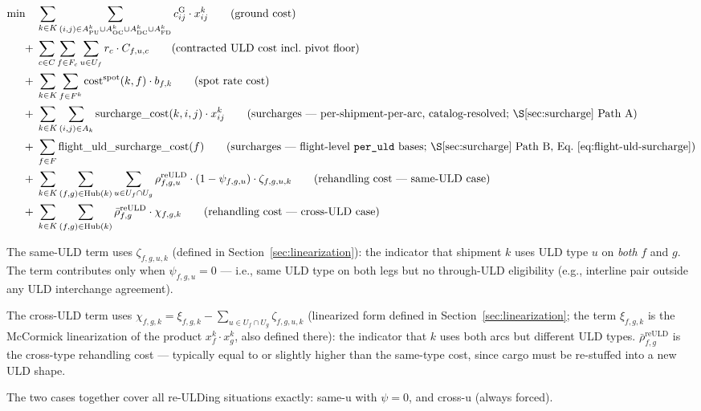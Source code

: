 \documentclass[11pt,a4paper]{article}
\theoremstyle{definition}
\begin{document}
\begin{align}
  \min \quad
  & \sum_{k \in K} \sum_{(i,j) \in A^k_{\text{PU}} \cup A^k_{\text{OC}} \cup A^k_{\text{DC}} \cup A^k_{\text{FD}}} c_{ij}^{\text{G}} \cdot x_{ij}^k
    \tag{ground cost} \\
  +\;
  & \sum_{c \in C} \sum_{f \in F_c} \sum_{u \in U_f} r_c \cdot C_{f,u,c}
    \tag{contracted ULD cost incl.\ pivot floor} \\
  +\;
  & \sum_{k \in K} \sum_{f \in F^k} \text{cost}^{\text{spot}}(k, f) \cdot b_{f,k}
    \tag{spot rate cost} \\
  +\;
  & \sum_{k \in K} \sum_{(i,j) \in A_k} \text{surcharge\_cost}(k, i, j) \cdot x_{ij}^k
    \tag{surcharges --- per-shipment-per-arc, catalog-resolved; \S\ref{sec:surcharge} Path~A} \\
  +\;
  & \sum_{f \in F} \text{flight\_uld\_surcharge\_cost}(f)
    \tag{surcharges --- flight-level \texttt{per\_uld} bases; \S\ref{sec:surcharge} Path~B, Eq.~\ref{eq:flight-uld-surcharge}} \\
  +\;
  & \sum_{k \in K} \sum_{(f,g) \in \text{Hub}(k)} \sum_{u \in U_f \cap U_g} \rho_{f,g,u}^{\text{reULD}} \cdot (1 - \psi_{f,g,u}) \cdot \zeta_{f,g,u,k}
    \tag{rehandling cost --- same-ULD case} \\
  +\;
  & \sum_{k \in K} \sum_{(f,g) \in \text{Hub}(k)} \bar{\rho}^{\text{reULD}}_{f,g} \cdot \chi_{f,g,k}
    \tag{rehandling cost --- cross-ULD case}
\end{align}

The same-ULD term uses $\zeta_{f,g,u,k}$ (defined in Section~\ref{sec:linearization}):
the indicator that shipment $k$ uses ULD type $u$ on \emph{both} $f$ and $g$. The term
contributes only when $\psi_{f,g,u} = 0$ --- i.e., same ULD type on both legs but no
through-ULD eligibility (e.g., interline pair outside any ULD interchange agreement).

The cross-ULD term uses $\chi_{f,g,k} = \xi_{f,g,k} - \sum_{u \in U_f \cap U_g} \zeta_{f,g,u,k}$
(linearized form defined in Section~\ref{sec:linearization}; the term $\xi_{f,g,k}$
is the McCormick linearization of the product $x_f^k \cdot x_g^k$, also defined
there): the indicator that $k$ uses both arcs but different ULD types.
$\bar{\rho}^{\text{reULD}}_{f,g}$ is the cross-type rehandling cost --- typically
equal to or slightly higher than the same-type cost, since cargo must be re-stuffed
into a new ULD shape.

The two cases together cover all re-ULDing situations exactly: same-u with $\psi=0$, and
cross-u (always forced).
\end{document}
